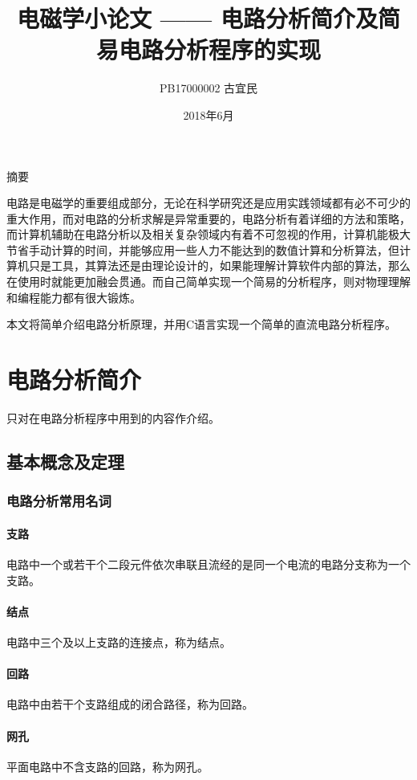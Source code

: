 \documentclass[UTF-8,cs4size]{ctexart}
\title{电磁学小论文 —— 电路分析简介及简易电路分析程序的实现}
\author{PB17000002  古宜民}
\date{2018年6月}
\begin{document}
 \normalsize
\maketitle
\begin{center}
	摘要
\end{center}

电路是电磁学的重要组成部分，无论在科学研究还是应用实践领域都有必不可少的重大作用，而对电路的分析求解是异常重要的，电路分析有着详细的方法和策略，而计算机辅助在电路分析以及相关复杂领域内有着不可忽视的作用，计算机能极大节省手动计算的时间，并能够应用一些人力不能达到的数值计算和分析算法，但计算机只是工具，其算法还是由理论设计的，如果能理解计算软件内部的算法，那么在使用时就能更加融会贯通。而自己简单实现一个简易的分析程序，则对物理理解和编程能力都有很大锻炼。 


本文将简单介绍电路分析原理，并用C语言实现一个简单的直流电路分析程序。
\clearpage
\section{电路分析简介}
只对在电路分析程序中用到的内容作介绍。 


\subsection{基本概念及定理}
\subsubsection{电路分析常用名词}
\paragraph{支路} 电路中一个或若干个二段元件依次串联且流经的是同一个电流的电路分支称为一个支路。
\paragraph{结点} 电路中三个及以上支路的连接点，称为结点。
\paragraph{回路} 电路中由若干个支路组成的闭合路径，称为回路。
\paragraph{网孔} 平面电路中不含支路的回路，称为网孔。
\end{document}
